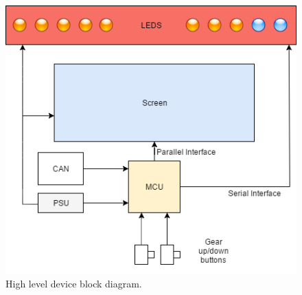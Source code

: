 \begin{figure}[H]
\begin{center}
\includegraphics[width=12cm]{Figures/refined_block_diagram.png}
\end{center}
\caption{High level device block diagram.}
\label{fig:block_diagram}
\end{figure}
